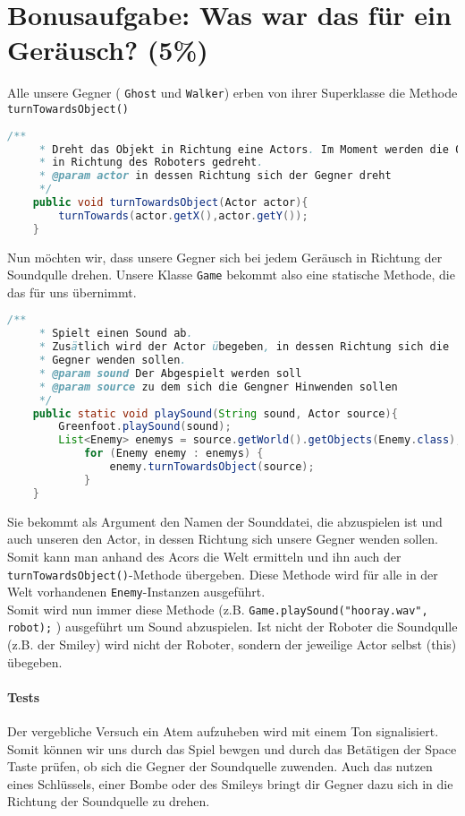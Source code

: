\documentclass{pi1}
\begin{document}
\section{Bonusaufgabe: Was war das für ein Geräusch? (5\%)}

Alle unsere Gegner ( \texttt{Ghost} und  \texttt{Walker}) erben von ihrer Superklasse die Methode \texttt{turnTowardsObject()}

\begin{lstlisting}[caption={Methode \emph{turnTowardsObject()}}, firstnumber=31, language=Java]
/**
     * Dreht das Objekt in Richtung eine Actors. Im Moment werden die Objekte
     * in Richtung des Roboters gedreht.
     * @param actor in dessen Richtung sich der Gegner dreht
     */
    public void turnTowardsObject(Actor actor){
        turnTowards(actor.getX(),actor.getY());
    }
\end{lstlisting}

Nun möchten wir, dass unsere Gegner sich bei jedem Geräusch in Richtung der Soundqulle drehen. Unsere Klasse \texttt{Game} bekommt also eine statische Methode, die das für uns übernimmt.

\begin{lstlisting}[caption={Methode \emph{playSound()} in der Klasse Game}, firstnumber=43, language=Java]
/**
     * Spielt einen Sound ab. 
     * Zusätlich wird der Actor übegeben, in dessen Richtung sich die
     * Gegner wenden sollen.
     * @param sound Der Abgespielt werden soll
     * @param source zu dem sich die Gengner Hinwenden sollen
     */
    public static void playSound(String sound, Actor source){
        Greenfoot.playSound(sound);
        List<Enemy> enemys = source.getWorld().getObjects(Enemy.class);
            for (Enemy enemy : enemys) {
                enemy.turnTowardsObject(source);
            }
    }
\end{lstlisting}

Sie bekommt als Argument den Namen der Sounddatei, die abzuspielen ist und auch unseren den Actor, in dessen Richtung sich unsere Gegner wenden sollen. Somit kann man anhand des Acors die Welt ermitteln und ihn auch der  \texttt{turnTowardsObject()}-Methode übergeben. Diese Methode wird für alle in der Welt vorhandenen  \texttt{Enemy}-Instanzen ausgeführt.\\
Somit wird nun immer diese Methode (z.B. \texttt{Game.playSound("hooray.wav", robot);} ) ausgeführt um Sound abzuspielen. Ist nicht der Roboter die Soundqulle (z.B. der Smiley) wird nicht der Roboter, sondern der jeweilige Actor selbst (this) übegeben.

\paragraph{Tests} Der vergebliche Versuch ein Atem aufzuheben wird mit einem Ton signalisiert. Somit können wir uns durch das Spiel bewgen und durch das Betätigen der Space Taste prüfen, ob sich die Gegner der Soundquelle zuwenden.
Auch das nutzen eines Schlüssels, einer Bombe oder des Smileys bringt dir Gegner dazu sich in die Richtung der Soundquelle zu drehen.
\end{document}
